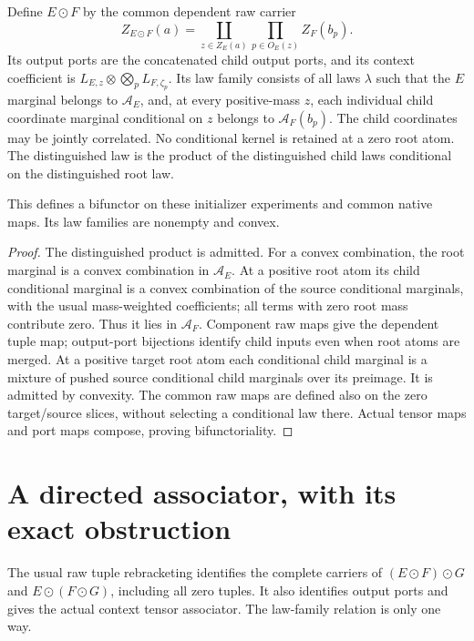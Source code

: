 \documentclass[11pt]{article}
\begin{document}
Define $E\odot F$ by the common dependent raw carrier
\[
 Z_{E\odot F}(a)=\coprod_{z\in Z_E(a)}
                      \prod_{p\in O_E(z)}Z_F(b_p).
\]
Its output ports are the concatenated child output ports, and its context coefficient is $L_{E,z}\otimes\bigotimes_pL_{F,\zeta_p}$. Its law family consists of all laws $\lambda$ such that the $E$ marginal belongs to $\mathcal A_E$, and, at every positive-mass $z$, each individual child coordinate marginal conditional on $z$ belongs to $\mathcal A_F(b_p)$. The child coordinates may be jointly correlated. No conditional kernel is retained at a zero root atom. The distinguished law is the product of the distinguished child laws conditional on the distinguished root law.

\begin{proposition}
This defines a bifunctor on these initializer experiments and common native maps. Its law families are nonempty and convex.
\end{proposition}
\begin{proof}
The distinguished product is admitted. For a convex combination, the root marginal is a convex combination in $\mathcal A_E$. At a positive root atom its child conditional marginal is a convex combination of the source conditional marginals, with the usual mass-weighted coefficients; all terms with zero root mass contribute zero. Thus it lies in $\mathcal A_F$. Component raw maps give the dependent tuple map; output-port bijections identify child inputs even when root atoms are merged. At a positive target root atom each conditional child marginal is a mixture of pushed source conditional child marginals over its preimage. It is admitted by convexity. The common raw maps are defined also on the zero target/source slices, without selecting a conditional law there. Actual tensor maps and port maps compose, proving bifunctoriality.\end{proof}

\section{A directed associator, with its exact obstruction}
The usual raw tuple rebracketing identifies the complete carriers of $(E\odot F)\odot G$ and $E\odot(F\odot G)$, including all zero tuples. It also identifies output ports and gives the actual context tensor associator. The law-family relation is only one way.
\end{document}

